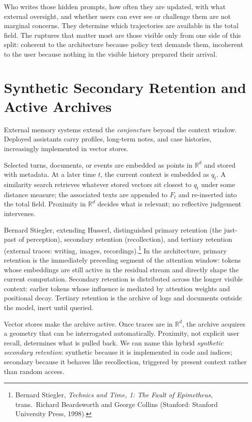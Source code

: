 \documentclass[12pt,a4paper]{article}
\begin{document}
Who writes those hidden prompts, how often they are updated, with what external oversight, and whether users can ever see or challenge them are not marginal concerns. They determine which trajectories are available in the total field. The ruptures that matter most are those visible only from one side of this split: coherent to the architecture because policy text demands them, incoherent to the user because nothing in the visible history prepared their arrival.

\section{Synthetic Secondary Retention and Active Archives}

External memory systems extend the \emph{conjoncture} beyond the context window. Deployed assistants carry profiles, long-term notes, and case histories, increasingly implemented in vector stores.

Selected turns, documents, or events are embedded as points in $\mathbb{R}^d$ and stored with metadata. At a later time $t$, the current context is embedded as $q_t$. A similarity search retrieves whatever stored vectors sit closest to $q_t$ under some distance measure; the associated texts are appended to $F_t$ and re-inserted into the total field. Proximity in $\mathbb{R}^d$ decides what is relevant; no reflective judgement intervenes.

Bernard Stiegler, extending Husserl, distinguished primary retention (the just-past of perception), secondary retention (recollection), and tertiary retention (external traces: writing, images, recordings).\footnote{Bernard Stiegler, \emph{Technics and Time, 1: The Fault of Epimetheus}, trans.\ Richard Beardsworth and George Collins (Stanford: Stanford University Press, 1998).} In the architecture, primary retention is the immediately preceding segment of the attention window: tokens whose embeddings are still active in the residual stream and directly shape the current computation. Secondary retention is distributed across the longer visible context: earlier tokens whose influence is mediated by attention weights and positional decay. Tertiary retention is the archive of logs and documents outside the model, inert until queried.

Vector stores make the archive active. Once traces are in $\mathbb{R}^d$, the archive acquires a geometry that can be interrogated automatically. Proximity, not explicit user recall, determines what is pulled back. We can name this hybrid \emph{synthetic secondary retention}: synthetic because it is implemented in code and indices; secondary because it behaves like recollection, triggered by present context rather than random access.
\end{document}
